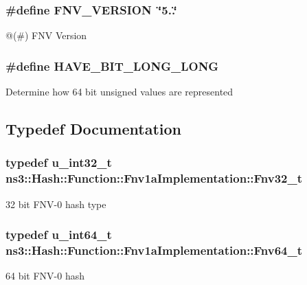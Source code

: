 \subsubsection[{\texorpdfstring{F\+N\+V\+\_\+\+V\+E\+R\+S\+I\+ON}{FNV_VERSION}}]{\setlength{\rightskip}{0pt plus 5cm}\#define F\+N\+V\+\_\+\+V\+E\+R\+S\+I\+ON~\char`\"{}5..\char`\"{}}\hypertarget{group__hash__fnv_gafc332c72d6d3d69585287caedad7c292}{}\label{group__hash__fnv_gafc332c72d6d3d69585287caedad7c292}
@(\#) F\+NV Version 
\subsubsection[{\texorpdfstring{H\+A\+V\+E\+\_\+64\+B\+I\+T\+\_\+\+L\+O\+N\+G\+\_\+\+L\+O\+NG}{HAVE_64BIT_LONG_LONG}}]{\setlength{\rightskip}{0pt plus 5cm}\#define H\+A\+V\+E\+\_\+B\+I\+T\+\_\+\+L\+O\+N\+G\+\_\+\+L\+O\+NG}\hypertarget{group__hash__fnv_gae08b3a786e98cbb5778e6fb75beaa485}{}\label{group__hash__fnv_gae08b3a786e98cbb5778e6fb75beaa485}
Determine how 64 bit unsigned values are represented 

\subsection{Typedef Documentation}
\subsubsection[{\texorpdfstring{Fnv32\+\_\+t}{Fnv32_t}}]{\setlength{\rightskip}{0pt plus 5cm}typedef u\+\_\+int32\+\_\+t {\bf ns3\+::\+Hash\+::\+Function\+::\+Fnv1a\+Implementation\+::\+Fnv32\+\_\+t}}\hypertarget{group__hash__fnv_ga6de33672f4d12dba1c58d1b9ff210d65}{}\label{group__hash__fnv_ga6de33672f4d12dba1c58d1b9ff210d65}
32 bit F\+N\+V-\/0 hash type 
\subsubsection[{\texorpdfstring{Fnv64\+\_\+t}{Fnv64_t}}]{\setlength{\rightskip}{0pt plus 5cm}typedef u\+\_\+int64\+\_\+t {\bf ns3\+::\+Hash\+::\+Function\+::\+Fnv1a\+Implementation\+::\+Fnv64\+\_\+t}}\hypertarget{group__hash__fnv_ga4b6673bffbef8355685a9e0129b86e16}{}\label{group__hash__fnv_ga4b6673bffbef8355685a9e0129b86e16}
64 bit F\+N\+V-\/0 hash 

